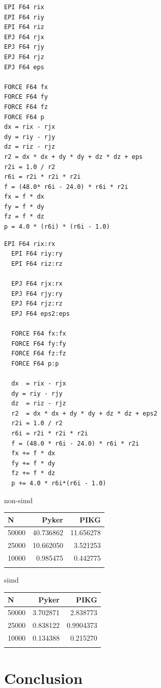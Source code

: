 \documentclass[ams, a4j]{U-AizuGT}
\begin{document}
\begin{lstlisting}[frame=single, caption=LennardJones-kernel.pyker, label=LennardJones-kernel.pyker]
EPI F64 rix
EPI F64 riy
EPI F64 riz
EPJ F64 rjx
EPJ F64 rjy
EPJ F64 rjz
EPJ F64 eps

FORCE F64 fx
FORCE F64 fy
FORCE F64 fz
FORCE F64 p
dx = rix - rjx
dy = riy - rjy
dz = riz - rjz
r2 = dx * dx + dy * dy + dz * dz + eps
r2i = 1.0 / r2
r6i = r2i * r2i * r2i
f = (48.0* r6i - 24.0) * r6i * r2i
fx = f * dx
fy = f * dy
fz = f * dz
p = 4.0 * (r6i) * (r6i - 1.0)
\end{lstlisting}
\begin{lstlisting}[frame=single, caption=LennardJones-kernel.pyker, label=LennardJones-kernel.pyker]
  EPI F64 rix:rx
  EPI F64 riy:ry
  EPI F64 riz:rz
  
  EPJ F64 rjx:rx
  EPJ F64 rjy:ry
  EPJ F64 rjz:rz
  EPJ F64 eps2:eps
  
  FORCE F64 fx:fx
  FORCE F64 fy:fy
  FORCE F64 fz:fz
  FORCE F64 p:p
  
  dx  = rix - rjx
  dy = riy - rjy
  dz  = riz - rjz
  r2  = dx * dx + dy * dy + dz * dz + eps2
  r2i = 1.0 / r2
  r6i = r2i * r2i * r2i
  f = (48.0 * r6i - 24.0) * r6i * r2i
  fx += f * dx
  fy += f * dy
  fz += f * dz
  p += 4.0 * r6i*(r6i - 1.0)

\end{lstlisting}


non-simd
\begin{tabular}{|l|r|r|} \hline
  N & Pyker & PIKG \\ \hline
  50000 & 40.736862 & 11.656278 \\
  25000 & 10.662050 & 3.521253 \\
  10000 & 0.985475 & 0.442775 \\
 \\ \hline
\end{tabular}


simd
\begin{tabular}{|l|r|r|} \hline
  N & Pyker & PIKG \\ \hline
  50000 & 3.702871  & 2.838773\\
  25000 & 0.838122 & 0.9904373 \\
  10000 & 0.134388 & 0.215270 \\

 \\ \hline
\end{tabular}



\section{Conclusion}
\end{document}
